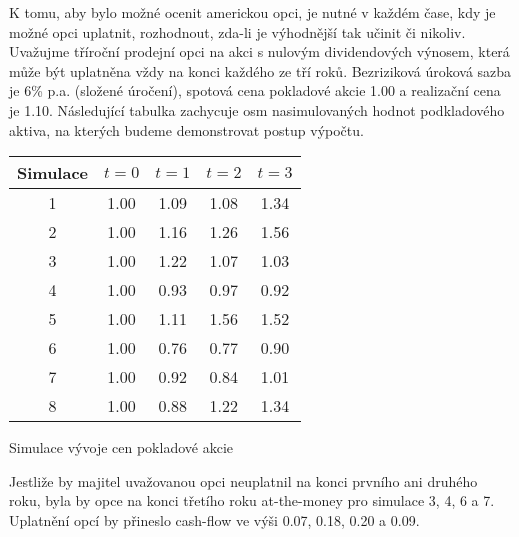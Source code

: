 \documentclass[a4paper]{book}
\begin{document}
K tomu, aby bylo možné ocenit americkou opci, je nutné v každém čase, kdy je možné opci uplatnit, rozhodnout, zda-li je výhodnější tak učinit či nikoliv. Uvažujme tříroční prodejní opci na akci s nulovým dividendových výnosem, která může být uplatněna vždy na konci každého ze tří roků. Bezriziková úroková sazba je 6\% p.a. (složené úročení), spotová cena pokladové akcie 1.00 a realizační cena je 1.10. Následující tabulka zachycuje osm nasimulovaných hodnot podkladového aktiva, na kterých budeme demonstrovat postup výpočtu.
\begin{center}
\begin{tabular}{c c c c c}
\hline
\textbf{Simulace} & $t=0$ & $t=1$ & $t=2$ & $t=3$ \\
\hline
1 & 1.00 & 1.09 & 1.08 & 1.34 \\
2 & 1.00 & 1.16 & 1.26 & 1.56 \\
3 & 1.00 & 1.22 & 1.07 & 1.03 \\
4 & 1.00 & 0.93 & 0.97 & 0.92 \\
5 & 1.00 & 1.11 & 1.56 & 1.52 \\
6 & 1.00 & 0.76 & 0.77 & 0.90 \\
7 & 1.00 & 0.92 & 0.84 & 1.01 \\
8 & 1.00 & 0.88 & 1.22 & 1.34 \\
\hline
\end{tabular}
\end{center}
\begin{center}
\small{Simulace vývoje cen pokladové akcie}
\end{center}
Jestliže by majitel uvažovanou opci neuplatnil na konci prvního ani druhého roku, byla by opce na konci třetího roku at-the-money pro simulace 3, 4, 6 a 7. Uplatnění opcí by přineslo cash-flow ve výši 0.07, 0.18, 0.20 a 0.09.
\end{document}
